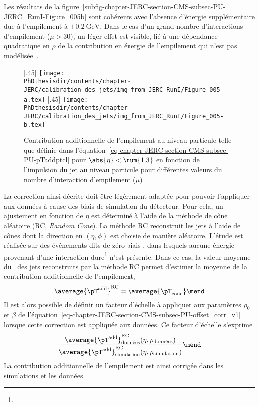 Les résultats de la figure~\ref{subfig-chapter-JERC-section-CMS-subsec-PU-JERC_RunI-Figure_005b} sont cohérents avec l'absence d'énergie supplémentaire due à l'empilement à $\pm\SI{0.2}{\GeV}$. Dans le cas d'un grand nombre d'interactions d'empilement ($\mu>30$), un léger effet est visible, lié à une dépendance quadratique en $\rho$ de la contribution en énergie de l'empilement qui n'est pas modélisée~\cite{JERC_RunI}.
\begin{figure}[h]
\centering
{}[.45\textwidth]
{\texttt{[image: \\PhDthesisdir/contents/chapter-JERC/calibration\_des\_jets/img\_from\_JERC\_RunI/Figure\_005-a.tex]}}
\hfill
{}[.45\textwidth]
{\texttt{[image: \\PhDthesisdir/contents/chapter-JERC/calibration\_des\_jets/img\_from\_JERC\_RunI/Figure\_005-b.tex]}}
\caption[Contribution additionnelle de l'empilement au niveau particule.]{Contribution additionnelle de l'empilement au niveau particule telle que définie dans l'équation~\eqref{eq-chapter-JERC-section-CMS-subsec-PU-pTaddptcl} pour $\abs{\eta}<\num{1.3}$ en fonction de l'impulsion du jet au niveau particule pour différentes valeurs du nombre d'interaction d'empilement ($\mu$)~\cite{JERC_RunI}.}
\label{fig-chapter-JERC-section-CMS-subsec-PU-JERC_RunI-Figure_005}
\end{figure}
\par La correction ainsi décrite doit être légèrement adaptée pour pouvoir l'appliquer aux données à cause des biais de simulation du détecteur.
Pour cela, un ajustement en fonction de $\eta$ est déterminé à l'aide de la méthode de cône aléatoire (RC, \emph {Random Cone}). La méthode RC reconstruit les jets à l'aide de cônes dont la direction en $(\eta, \phi)$ est choisie de manière aléatoire.
L'étude est réalisée sur des événements dits de \og zéro biais \fg, dans lesquels aucune énergie provenant d'une interaction dure\footnote{} n'est présente.
Dans ce cas, la valeur moyenne du \pT\ des jets reconstruits par la méthode RC permet d'estimer la moyenne de la contribution additionnelle de l'empilement, \ie
\begin{equation}
\average{\pT^\text{add}}^\text{RC} = \average{\pT_\text{cône}}
\mend
\end{equation}
Il est alors possible de définir un facteur d'échelle à appliquer aux paramètres $\rho_0$ et $\beta$ de l'équation~\eqref{eq-chapter-JERC-section-CMS-subsec-PU-offset_corr_v1} lorsque cette correction est appliquée aux données. Ce facteur d'échelle s'exprime
\begin{equation}
\frac{\average{\pT^\text{add}}^\text{RC}_\text{données}(\eta, \rho_\text{données})}{\average{\pT^\text{add}}^\text{RC}_\text{simulation}(\eta, \rho_\text{simulation})}
\mend
\end{equation}
La contribution additionnelle de l'empilement est ainsi corrigée dans les simulations et les données.

